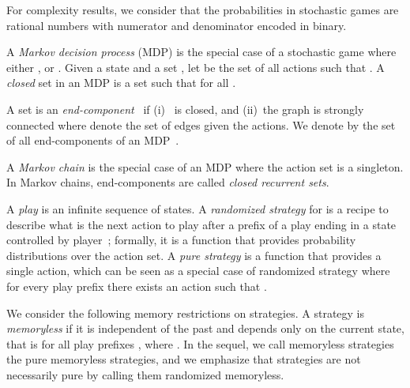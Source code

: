 \documentclass{article}
\begin{document}
For complexity results, we consider that the probabilities in stochastic games
are rational numbers with numerator and denominator 
encoded in binary.

\smallskip{}
A \emph{Markov decision process} (MDP) is the special case of a stochastic
game where either , or . 
Given a state  and a set ,
let  be the set of all actions  such 
that . 
A \emph{closed} set in an MDP is a set  such 
that  for all . 
\begin{comment}
The transition function  of the sub-MDP induced by a closed set  is 
defined, for all  and , by  if , 
and  for arbitrary  otherwise.
The closed set  is an \emph{end-component} if the underlying 
graph of the sub-MDP induced by  is strongly connected~\cite{CY95}.
We denote by  the set of all end-components of an MDP~.  
\end{comment}
A set  is an {\em end-component}~\cite{CY95} if (i)~ is closed, and 
(ii)~the graph  is strongly connected
where 
denote the set of edges given the actions.
We denote by  the set of all end-components of an MDP~.  

\smallskip{}
A \emph{Markov chain} is the special case of an MDP 
where the action set  is a singleton. In Markov chains,
end-components are called \emph{closed recurrent sets}.







\smallskip{}
A \emph{play} is an infinite sequence  of states.
A \emph{randomized strategy} for  is a recipe to describe what is the next action to play
after a prefix of a play ending in a state controlled by player~;
formally, it is a function  that provides
probability distributions over the action set. 
A \emph{pure strategy} is a function  that provides
a single action, which can be seen as a special case of randomized strategy
where for every play prefix  there exists an action  
such that .


We consider the following memory restrictions on strategies.
A strategy  is \emph{memoryless} if it is independent of the past and depends only on 
the current state, that is  for all play prefixes 
, where .
In the sequel, we call memoryless strategies the pure memoryless strategies,
and we emphasize that strategies  are not necessarily 
pure by calling them randomized memoryless.
\end{document}
